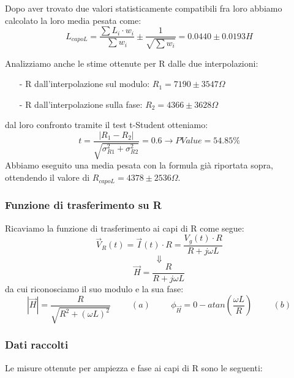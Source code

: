 \documentclass{article}
\theoremstyle{definition}
\begin{document}
\noindent Dopo aver trovato due valori statisticamente compatibili fra loro abbiamo calcolato la loro media pesata come:
\[L_{capoL} = \frac{\sum{L_{i} \cdot w_{i}}}{\sum{w_{i}}}\pm \frac{1}{\sqrt{\sum{w_{i}}}} = 0.0440 \pm 0.0193 H\]

\noindent Analizziamo anche le stime ottenute per R dalle due interpolazioni:
\begin{enumerate}
    \item[-] R dall'interpolazione sul modulo: \(R_{1} =  7190\pm 3547\Omega \)
    \item[-] R dall'interpolazione sulla fase: \(R_{2} =  4366\pm  3628\Omega\)
\end{enumerate}

\noindent dal loro confronto tramite il test t-Student otteniamo:
\[t = \frac{\left| R_{1} - R_{2}\right|}{\sqrt{\sigma^{2}_{R1} + \sigma^{2}_{R2}}} = 0.6 \rightarrow PValue = 54.85\%\]
\noindent Abbiamo eseguito una media pesata con la formula già riportata sopra, ottendendo il valore di \( R_{capoL} =  4378 \pm 2536 \Omega\).

\pagebreak
\subsubsection{Funzione di trasferimento su R}
Ricaviamo la funzione di trasferimento ai capi di R come segue:
\[\vec{V}_{R}(t) = \vec{I}(t) \cdot R = \frac{V_{g}(t) \cdot R}{R + j\omega L}\]
\[\Downarrow\]
\[\vec{H} = \frac{R}{R + j \omega L}\]
da cui riconosciamo il suo modulo e la sua fase: 
\[\left|\vec{H} \right| = \frac{R}{\sqrt{R^{2} + (\omega L)^{2}}}\hspace{1cm} (a)\hspace{1cm} \phi_{\vec{H}} = 0 - atan\left(\frac{\omega L }{R}\right)\hspace{1cm} (b) \]

\subsubsection*{Dati raccolti}
Le misure ottenute per ampiezza e fase ai capi di R sono le seguenti:
\end{document}
